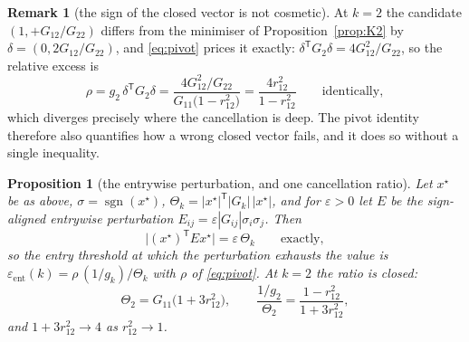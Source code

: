\documentclass[11pt,a4paper]{article}
\theoremstyle{plain}
\newtheorem{proposition}[theorem]{Proposition}
\theoremstyle{definition}
\newtheorem{remark}[theorem]{Remark}
\newcommand{\T}{\mathsf{T}}
\DeclareMathOperator{\sgn}{sgn}
\begin{document}
\begin{remark}[the sign of the closed vector is not cosmetic]
\label{rem:wrongsign}
At $k=2$ the candidate $(1,+G_{12}/G_{22})$ differs from the minimiser of
Proposition~\ref{prop:K2} by $\delta=(0,2G_{12}/G_{22})$, and
\eqref{eq:pivot} prices it exactly:
$\delta^{\T}G_2\delta=4G_{12}^{2}/G_{22}$, so the relative excess is
\begin{equation}
\label{eq:wrongsign}
  \rho=g_2\,\delta^{\T}G_2\delta
  =\frac{4G_{12}^{2}/G_{22}}{G_{11}\bigl(1-r_{12}^{2}\bigr)}
  =\frac{4r_{12}^{2}}{1-r_{12}^{2}}
  \qquad\text{identically},
\end{equation}
which diverges precisely where the cancellation is deep. The pivot identity
therefore also quantifies how a wrong closed vector fails, and it does so
without a single inequality.
\end{remark}

\begin{proposition}[the entrywise perturbation, and one cancellation ratio]
\label{prop:union}
Let $x^{\star}$ be as above, $\sigma=\sgn(x^{\star})$,
$\Theta_k=|x^{\star}|^{\T}|G_k|\,|x^{\star}|$, and for $\varepsilon>0$ let
$E$ be the sign-aligned entrywise perturbation $E_{ij}=\varepsilon|G_{ij}|
\sigma_i\sigma_j$. Then
\begin{equation}
\label{eq:union}
  \bigl|(x^{\star})^{\T}Ex^{\star}\bigr|=\varepsilon\,\Theta_k
  \qquad\text{exactly},
\end{equation}
so the entry threshold at which the perturbation exhausts the value is
$\varepsilon_{\mathrm{ent}}(k)=\rho\,(1/g_k)/\Theta_k$ with $\rho$ of
\eqref{eq:pivot}. At $k=2$ the ratio is closed:
\begin{equation}
\label{eq:union2}
  \Theta_2=G_{11}\bigl(1+3r_{12}^{2}\bigr),
  \qquad
  \frac{1/g_2}{\Theta_2}=\frac{1-r_{12}^{2}}{1+3r_{12}^{2}},
\end{equation}
and $1+3r_{12}^{2}\to4$ as $r_{12}^{2}\to1$.
\end{proposition}
\end{document}
